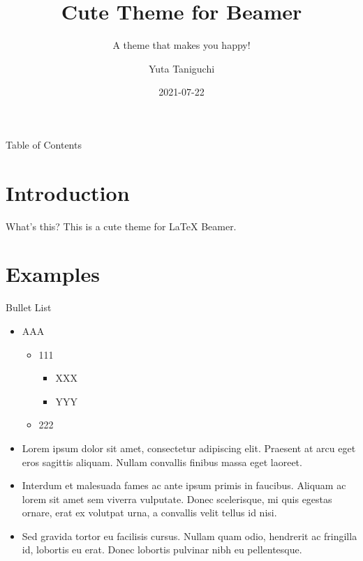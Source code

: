 \documentclass[t]{beamer}  %
\title[Cute Theme]{Cute Theme for Beamer}
\subtitle{A theme that makes you happy!}
\author[Y.~Taniguchi]{Yuta Taniguchi}
\institute{@yuttieyuttie}
\date{2021-07-22}
\begin{document}
{
  \frame{\titlepage}
}
\setcounter{framenumber}{0}


\begin{frame}{Table of Contents}
  \centering
  \toc
\end{frame}


\section{Introduction}
\begin{frame}{What's this?}
  This is a cute theme for LaTeX Beamer.
\end{frame}


\section{Examples}
\begin{frame}{Bullet List}
  \begin{itemize}
    \item AAA
      \begin{itemize}
        \item 111
          \begin{itemize}
            \item XXX
            \item YYY
          \end{itemize}
        \item 222
      \end{itemize}
    \item Lorem ipsum dolor sit amet, consectetur adipiscing elit. Praesent at arcu eget eros sagittis aliquam. Nullam convallis finibus massa eget laoreet.
    \item Interdum et malesuada fames ac ante ipsum primis in faucibus. Aliquam ac lorem sit amet sem viverra vulputate. Donec scelerisque, mi quis egestas ornare, erat ex volutpat urna, a convallis velit tellus id nisi.
    \item Sed gravida tortor eu facilisis cursus. Nullam quam odio, hendrerit ac fringilla id, lobortis eu erat. Donec lobortis pulvinar nibh eu pellentesque.
  \end{itemize}
\end{frame}
\end{document}
